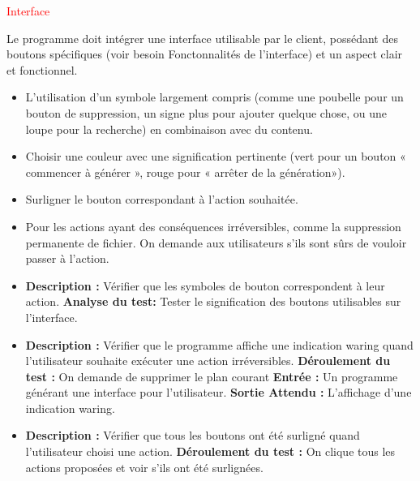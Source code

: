 \besoin{}
{\textcolor{red}{Interface}}
{
Le programme doit intégrer une interface utilisable par le client, possédant des boutons spécifiques (voir besoin Fonctonnalités de l'interface) et un aspect clair et fonctionnel.

\begin{itemize}
\item L’utilisation d’un symbole largement compris (comme une poubelle pour un bouton de suppression, un signe plus pour ajouter quelque chose, ou une loupe pour la recherche) en combinaison avec du contenu.

\item Choisir une couleur avec une signification pertinente (vert pour un bouton « commencer à générer », rouge pour « arrêter de la génération»).

\item Surligner le bouton correspondant à l’action souhaitée.

\item Pour les actions ayant des conséquences irréversibles, comme la suppression permanente de fichier. On  demande aux utilisateurs s’ils sont sûrs de vouloir passer à l’action.
\end{itemize}
}
{}
{
\begin{itemize}

\item \textbf{Description : } Vérifier que les symboles de bouton correspondent à leur action.\newline
\textbf{ Analyse du test: } Tester le signification des boutons utilisables sur l'interface. \newline


\item \textbf{ Description : }Vérifier que le programme affiche une indication waring quand l'utilisateur souhaite exécuter une action  irréversibles. \newline
\textbf{Déroulement du test : } On demande de supprimer le plan courant  \newline
\textbf{Entrée : } Un programme générant une interface pour l'utilisateur.\newline
\textbf{Sortie Attendu : }  L'affichage d'une indication waring.

\item \textbf{ Description  : } Vérifier que  tous les boutons ont été surligné quand l'utilisateur choisi une action.
\textbf{Déroulement du test : } On clique tous les actions proposées et voir s’ils ont été surlignées. \newline
\end{itemize}
}
